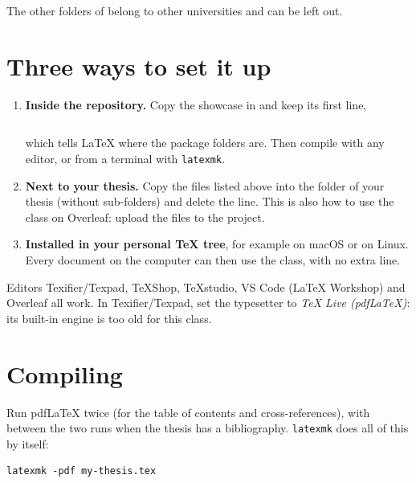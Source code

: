 The other folders of  belong to other universities and
can be left out.

\section{Three ways to set it up}

\begin{enumerate}
  \item \textbf{Inside the repository.} Copy the \unishort{} showcase in
     and keep its first line,
    \begin{lstlisting}

    \end{lstlisting}
    which tells \LaTeX{} where the package folders are. Then compile with
    any editor, or from a terminal with \texttt{latexmk}.
  \item \textbf{Next to your thesis.} Copy the files listed above into the
    folder of your thesis (without sub-folders) and delete the
    \verb|| line. This is also how to
    use the class on Overleaf: upload the files to the project.
  \item \textbf{Installed in your personal \TeX{} tree}, for example
     on macOS or
     on Linux. Every document on the
    computer can then use the class, with no extra line.
\end{enumerate}

\begin{notebox}{Editors}
Texifier/Texpad, TeXShop, TeXstudio, VS Code (LaTeX Workshop) and Overleaf
all work. In Texifier/Texpad, set the typesetter to \emph{TeX Live
(pdfLaTeX)}: its built-in engine is too old for this class.
\end{notebox}

\section{Compiling}

Run pdf\LaTeX{} twice (for the table of contents and cross-references),
with  between the two runs when the thesis has a bibliography.
\texttt{latexmk} does all of this by itself:

\begin{lstlisting}[style=shell]
latexmk -pdf my-thesis.tex
\end{lstlisting}

